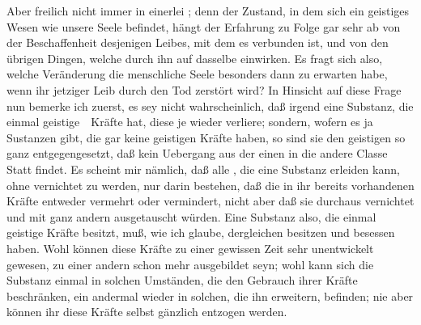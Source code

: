 \begin{aufza}
\item Aber freilich nicht immer in einerlei ; denn der Zustand, in dem sich ein geistiges Wesen wie unsere Seele befindet, hängt der Erfahrung zu Folge gar sehr ab von der Beschaffenheit desjenigen Leibes, mit dem es verbunden ist, und von den übrigen Dingen, welche durch ihn auf dasselbe einwirken. Es fragt sich also, welche Veränderung die menschliche Seele besonders dann zu erwarten habe, wenn ihr jetziger Leib durch den Tod zerstört wird? In Hinsicht auf diese Frage nun bemerke ich zuerst, es sey nicht wahrscheinlich, daß irgend eine Substanz, die einmal geistige~\ Kräfte hat, diese je wieder verliere; sondern, wofern es ja Sustanzen gibt, die gar keine geistigen Kräfte haben, so sind sie den geistigen so ganz entgegengesetzt, daß kein Uebergang aus der einen in die andere Classe Statt findet. Es scheint mir nämlich, daß alle , die eine Substanz erleiden kann, ohne vernichtet zu werden, nur darin bestehen, daß die in ihr bereits vorhandenen Kräfte entweder vermehrt oder vermindert, nicht aber daß sie durchaus vernichtet und mit ganz andern ausgetauscht würden. Eine Substanz also, die einmal geistige Kräfte besitzt, muß, wie ich glaube,  dergleichen besitzen und besessen haben. Wohl können diese Kräfte zu einer gewissen Zeit sehr unentwickelt gewesen, zu einer andern schon mehr ausgebildet seyn; wohl kann sich die Substanz einmal in solchen Umständen, die den Gebrauch ihrer Kräfte beschränken, ein andermal wieder in solchen, die ihn erweitern, befinden; nie aber können ihr diese Kräfte selbst gänzlich entzogen werden.

\end{aufza}
